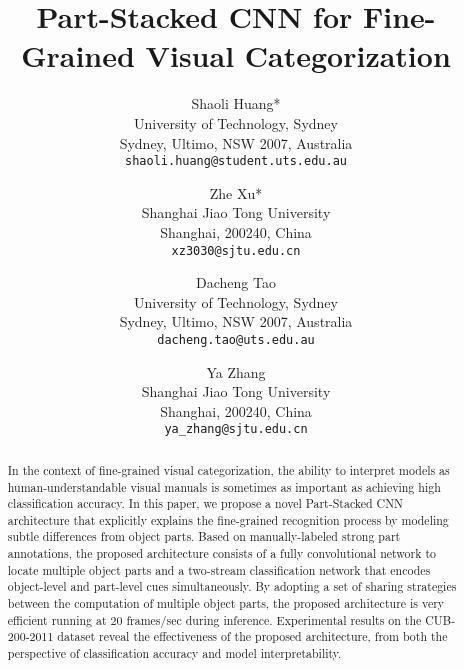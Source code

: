 \documentclass[10pt,twocolumn,letterpaper]{article}
\begin{document}
\title{Part-Stacked CNN for Fine-Grained Visual Categorization}


\author{Shaoli Huang*\\
University of Technology, Sydney\\
Sydney, Ultimo, NSW 2007, Australia\\
{\tt\small shaoli.huang@student.uts.edu.au}
\and
Zhe Xu*\\
Shanghai Jiao Tong University\\
Shanghai, 200240, China\\
{\tt\small xz3030@sjtu.edu.cn}
\and
Dacheng Tao\\
University of Technology, Sydney\\
Sydney, Ultimo, NSW 2007, Australia\\
{\tt\small dacheng.tao@uts.edu.au}
\and
Ya Zhang\\
Shanghai Jiao Tong University\\
Shanghai, 200240, China\\
{\tt\small ya\_zhang@sjtu.edu.cn}
}


\iffalse
\author[1]{Shaoli Huang}
\author[1,2]{Zhe Xu}
\author[1]{Dacheng Tao}
\author[2]{Ya Zhang\vspace{-4mm}}
\affil[1]{\small{Centre for Quantum Computation and Intelligent Systems, Faculty of Engineering and Information Technology,
University of Technology, Sydney, Ultimo, NSW 2007, Australia}
\affil[2]
{\small{Cooperative Medianet Innovation Center and the Shanghai Key Laboratory of Multimedia Processing and Transmissions, Shanghai Jiao Tong University, Shanghai, 200240, China
}}
\authorcr
\href{shaoli.huang@student.uts.edu.au}{\tt\small\{shaoli.huang@student.,dacheng.tao@\}uts.edu.au, }{\{xz3030,ya\_zhang\}@sjtu.edu.cn}\vspace{-4mm}
}
\fi


\maketitle


\begin{abstract}


   In the context of fine-grained visual categorization, the ability to interpret models as human-understandable visual manuals is sometimes as important as achieving high classification accuracy. In this paper, we propose a novel Part-Stacked CNN architecture that explicitly explains the fine-grained recognition process by modeling subtle differences from object parts. Based on manually-labeled strong part annotations, the proposed architecture consists of a fully convolutional network to locate multiple object parts and a two-stream classification network that encodes object-level and part-level cues simultaneously. By adopting a set of sharing strategies between the computation of multiple object parts, the proposed architecture is very efficient running at $20$ frames/sec during inference. Experimental results on the CUB-200-2011 dataset reveal the effectiveness of the proposed architecture, from both the perspective of classification accuracy and model interpretability.
\end{abstract}
\end{document}
